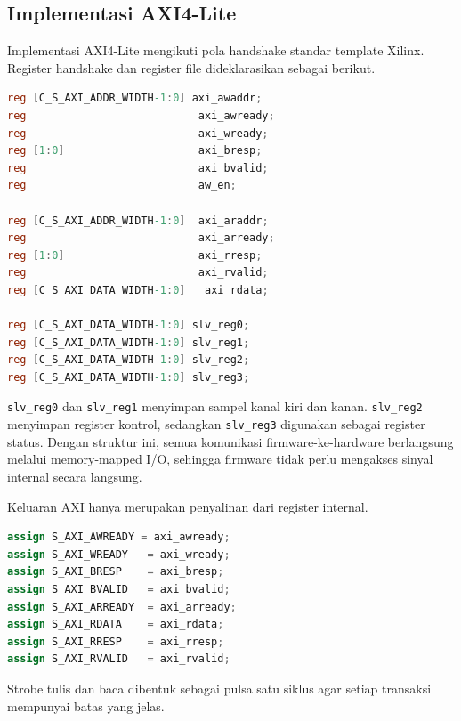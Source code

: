 \subsection{Implementasi AXI4-Lite}

Implementasi AXI4-Lite mengikuti pola handshake standar template Xilinx. Register handshake dan register file dideklarasikan sebagai berikut.

\begin{lstlisting}[language=Verilog,caption={Register internal kanal AXI4-Lite dan register file empat register.},label={lst:ch4-axi-signals}]
reg [C_S_AXI_ADDR_WIDTH-1:0] axi_awaddr;
reg                           axi_awready;
reg                           axi_wready;
reg [1:0]                     axi_bresp;
reg                           axi_bvalid;
reg                           aw_en;

reg [C_S_AXI_ADDR_WIDTH-1:0]  axi_araddr;
reg                           axi_arready;
reg [1:0]                     axi_rresp;
reg                           axi_rvalid;
reg [C_S_AXI_DATA_WIDTH-1:0]   axi_rdata;

reg [C_S_AXI_DATA_WIDTH-1:0] slv_reg0;
reg [C_S_AXI_DATA_WIDTH-1:0] slv_reg1;
reg [C_S_AXI_DATA_WIDTH-1:0] slv_reg2;
reg [C_S_AXI_DATA_WIDTH-1:0] slv_reg3;
\end{lstlisting}

\texttt{slv\_reg0} dan \texttt{slv\_reg1} menyimpan sampel kanal kiri dan kanan. \texttt{slv\_reg2} menyimpan register kontrol, sedangkan \texttt{slv\_reg3} digunakan sebagai register status. Dengan struktur ini, semua komunikasi firmware-ke-hardware berlangsung melalui memory-mapped I/O, sehingga firmware tidak perlu mengakses sinyal internal secara langsung.

Keluaran AXI hanya merupakan penyalinan dari register internal.

\begin{lstlisting}[language=Verilog,caption={Pengaitan output AXI4-Lite terhadap register internal.},label={lst:ch4-axi-assign}]
assign S_AXI_AWREADY = axi_awready;
assign S_AXI_WREADY   = axi_wready;
assign S_AXI_BRESP    = axi_bresp;
assign S_AXI_BVALID   = axi_bvalid;
assign S_AXI_ARREADY  = axi_arready;
assign S_AXI_RDATA    = axi_rdata;
assign S_AXI_RRESP    = axi_rresp;
assign S_AXI_RVALID   = axi_rvalid;
\end{lstlisting}

Strobe tulis dan baca dibentuk sebagai pulsa satu siklus agar setiap transaksi mempunyai batas yang jelas.

